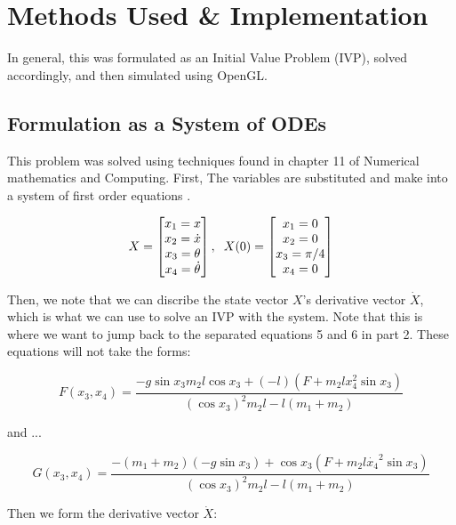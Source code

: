 \documentclass[12pt]{article}
\begin{document}
\section{Methods Used \& Implementation}

In general, this was formulated as an Initial Value Problem (IVP), solved accordingly,
and then simulated using OpenGL.

\subsection{Formulation as a System of ODEs}

This problem was solved using techniques found in chapter 11 of Numerical mathematics
and Computing. First, The variables are substituted and make into a system of first
order equations \cite{classbook}.

\[
X =
\begin{bmatrix}
  x_1 = x \\
  x_2 = \dot{x} \\
  x_3 = \theta \\
  x_4 = \dot{\theta}
\end{bmatrix}
,
\hspace{2mm}
X(0) =
\begin{bmatrix}
  x_1 = 0 \\
  x_2 = 0 \\
  x_3 = \pi / 4 \\
  x_4 = 0
\end{bmatrix}
\]

Then, we note that we can discribe the state vector $X$'s derivative vector $\dot{X}$,
which is what we can use to solve an IVP with the system. Note that this is where we want
to jump back to the separated equations 5 and 6 in part 2. These equations will not take the forms:

\begin{equation} \label{eq:7}
F(x_3, x_4) = \frac{-g \sin x_3 m_2 l \cos x_3 + (-l)(F + m_2 l x_4^2 \sin x_3) }{ (\cos x_3)^2 m_2 l - l(m_1 + m_2) }
\end{equation}

and ...

\begin{equation} \label{eq:8}
G(x_3, x_4) = \frac{-(m_1 + m_2)(-g \sin x_3) + \cos x_3 (F + m_2 l \dot{x_4}^2 \sin x_3) }{ (\cos x_3)^2 m_2 l - l(m_1 + m_2) }
\end{equation}

Then we form the derivative vector $\dot{X}$:
\end{document}

